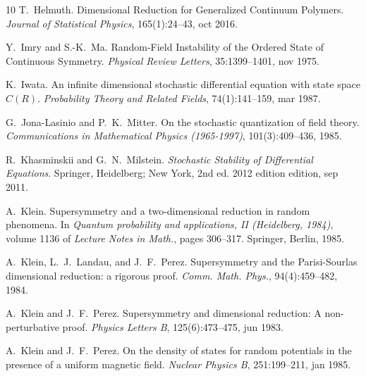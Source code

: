 \documentclass[a4paper,10pt]{article}
\newcommand{\tmtextit}[1]{{\itshape{#1}}}
\begin{document}
\begin{thebibliography}{10}
  T.~Helmuth. {\newblock}Dimensional
  Reduction for Generalized Continuum Polymers. {\newblock}\tmtextit{Journal
  of Statistical Physics}, 165(1):24--43, oct 2016.{\newblock}
  
  Y.~Imry  and  S.-K.~Ma.
  {\newblock}Random-Field Instability of the Ordered State of Continuous
  Symmetry. {\newblock}\tmtextit{Physical Review Letters}, 35:1399--1401, nov
  1975.{\newblock}
  
  K.~Iwata. {\newblock}An infinite
  dimensional stochastic differential equation with state space $C (R)$.
  {\newblock}\tmtextit{Probability Theory and Related Fields}, 74(1):141--159,
  mar 1987.{\newblock}
  
  G.~Jona-Lasinio  and 
  P.~K.~Mitter. {\newblock}On the stochastic quantization of field theory.
  {\newblock}\tmtextit{Communications in Mathematical Physics (1965-1997)},
  101(3):409--436, 1985.{\newblock}
  
  R.~Khasminskii  and 
  G.~N.~Milstein. {\newblock}\tmtextit{Stochastic Stability of Differential
  Equations}. {\newblock}Springer, Heidelberg; New York, 2nd ed. 2012 edition 
  edition, sep 2011.{\newblock}
  
  A.~Klein. {\newblock}Supersymmetry and
  a two-dimensional reduction in random phenomena. {\newblock}In
  \tmtextit{Quantum probability and applications, II (Heidelberg, 1984)}, 
  volume  1136  of \tmtextit{Lecture Notes in Math.},  pages  306--317.
  Springer, Berlin, 1985.{\newblock}
  
  A.~Klein, L.~J.~Landau, and  J.~F.~Perez.
  {\newblock}Supersymmetry and the Parisi-Sourlas dimensional reduction: a
  rigorous proof. {\newblock}\tmtextit{Comm. Math. Phys.}, 94(4):459--482,
  1984.{\newblock}
  
  A.~Klein  and  J.~F.~Perez.
  {\newblock}Supersymmetry and dimensional reduction: A non-perturbative
  proof. {\newblock}\tmtextit{Physics Letters B}, 125(6):473--475, jun
  1983.{\newblock}
  
  A.~Klein  and  J.~F.~Perez. {\newblock}On
  the density of states for random potentials in the presence of a uniform
  magnetic field. {\newblock}\tmtextit{Nuclear Physics B}, 251:199--211, jan
  1985.{\newblock}
  

\end{thebibliography}
\end{document}
